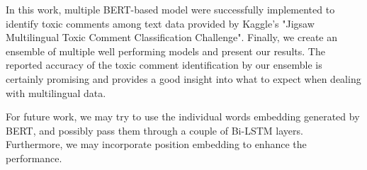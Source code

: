 \documentclass[10pt,twocolumn,letterpaper]{article}
\begin{document}
In this work, multiple BERT-based model were successfully implemented to identify toxic comments among text data provided by Kaggle's "Jigsaw Multilingual Toxic Comment Classification Challenge". Finally, we create an ensemble of multiple well performing models and present our results. The reported accuracy of the toxic comment identification by our ensemble is certainly promising and provides a good insight into what to expect when dealing with multilingual data.  

For future work, we may try to use the individual words embedding generated by BERT, and possibly pass them through a couple of Bi-LSTM layers. Furthermore, we may incorporate position embedding to enhance the performance.


{\small


}
\end{document}
